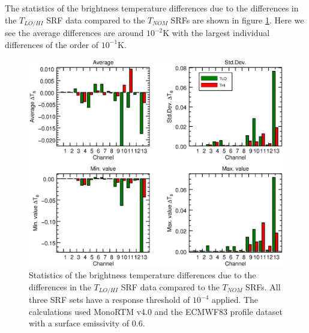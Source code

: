 The statistics of the brightness temperature differences due to the differences in the $T_{LO/HI}$ SRF data compared to the $T_{NOM}$ SRFs are shown in figure \ref{fig:TLO-THI_dTb_stats}. Here we see the average differences are around $10^{-2}$K with the largest individual differences of the order of $10^{-1}$K.

\begin{figure}[H]
  \centering
  \includegraphics[scale=0.75]{graphics/TLO-THI_dTb_stats.eps}
  \caption{Statistics of the brightness temperature differences due to the differences in the $T_{LO/HI}$ SRF data compared to the $T_{NOM}$ SRFs. All three SRF sets have a response threshold of $10^{-4}$ applied. The calculations used MonoRTM v4.0 and the ECMWF83 profile dataset with a surface emissivity of 0.6.}
  \label{fig:TLO-THI_dTb_stats}
\end{figure}


\clearpage




\begin{appendix}
  
  
\end{appendix}



